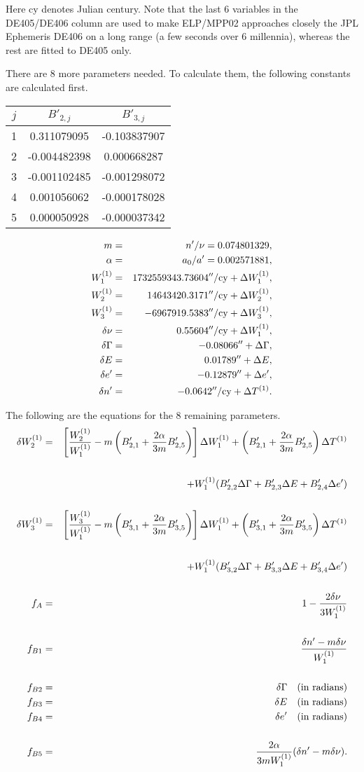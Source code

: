 \documentclass[12pt]{article}
\newcommand \beqn {\begin{eqnarray}}
\newcommand \eeqn {\end{eqnarray}}
\begin{document}
\vskip 0.5cm
Here cy denotes Julian century. Note that the last 6 variables in the DE405/DE406 
column are used to make ELP/MPP02 approaches closely the JPL Ephemeris DE406 on 
a long range (a few seconds over 6 millennia), whereas the rest are fitted to DE405 
only. 

There are 8 more parameters needed. To calculate them, the following 
constants are calculated first.
\vskip 0.5cm
\begin{tabular}{ccc} 
  \hline 
 $j$ & $B'_{2,j}$ & $B'_{3,j}$ \\ 
\hline
  1 & 0.311079095 & -0.103837907 \\ 
  2 & -0.004482398 & 0.000668287 \\ 
  3 & -0.001102485 & -0.001298072 \\
  4 & 0.001056062 & -0.000178028 \\ 
  5 & 0.000050928 & -0.000037342 \\
\hline
\end{tabular}
\beqn
  m &=& n'/\nu = 0.074801329 , \cr
  \alpha &=& a_0/a' = 0.002571881, \cr 
  W_1^{(1)} &=& 1732559343.73604''/{\rm cy} + \Delta W_1^{(1)} , \cr 
  W_2^{(1)} &=& 14643420.3171''/{\rm cy} + \Delta W_2^{(1)} , \cr 
  W_3^{(1)} &=& -6967919.5383''/{\rm cy} + \Delta W_3^{(1)} , \cr
  \delta \nu &=& 0.55604''/{\rm cy} + \Delta W_1^{(1)} , \cr 
  \delta \Gamma &=& -0.08066'' + \Delta \Gamma , \cr 
  \delta E &=& 0.01789'' + \Delta E , \cr
  \delta e' &=& -0.12879'' + \Delta e' , \cr
  \delta n' &=& -0.0642''/{\rm cy} + \Delta T^{(1)} . \nonumber
\eeqn

The following are the equations for the 8 remaining parameters. 
\beqn
  \delta W_2^{(1)} &=& \left[ \frac{W_2^{(1)}}{W_1^{(1)}} - m\left( B'_{2,1} 
+ \frac{2\alpha}{3m}B'_{2,5}\right) \right] \Delta W_1^{(1)} + \left( 
B'_{2,1} + \frac{2\alpha}{3m}B'_{2,5}\right) \Delta T^{(1)} \cr \cr 
&&+ W_1^{(1)} (B'_{2,2} \Delta \Gamma + B'_{2,3} \Delta E + B'_{2,4} \Delta e') \cr \cr 
  \delta W_3^{(1)} &=& \left[ \frac{W_3^{(1)}}{W_1^{(1)}} - m\left( B'_{3,1}
+ \frac{2\alpha}{3m}B'_{3,5}\right) \right] \Delta W_1^{(1)} + \left(
B'_{3,1} + \frac{2\alpha}{3m}B'_{3,5}\right) \Delta T^{(1)} \cr \cr
&&+ W_1^{(1)} (B'_{3,2} \Delta \Gamma + B'_{3,3} \Delta E + B'_{3,4} \Delta e') \cr \cr 
  f_A &=& 1 - \frac{2 \delta \nu}{3 W_1^{(1)}} \cr \cr 
  f_{B1} &=& \frac{\delta n' - m\delta \nu}{W_1^{(1)}} \cr \cr 
  f_{B2} &=& \delta \Gamma \ \ \mbox{ (in radians)} \cr 
  f_{B3} &=& \delta E \ \ \mbox{ (in radians)} \cr 
  f_{B4} &=& \delta e' \ \ \mbox{ (in radians)} \cr \cr
  f_{B5} &=& \frac{2\alpha}{3m W_1^{(1)}} (\delta n' - m \delta \nu) . \nonumber
\eeqn
\end{document}
